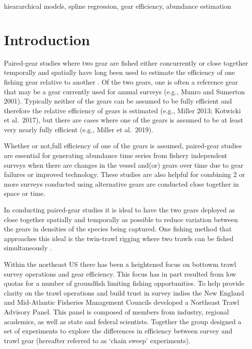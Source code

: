 \documentclass[]{article}
\begin{document}
hieararchical models, spline regression, gear efficiency, abundance
estimation

\pagebreak

\hypertarget{introduction}{%
\section{Introduction}\label{introduction}}

Paired-gear studies where two gear are fished either concurrently or
close together temporally and spatially have long been used to estimate
the efficiency of one fishing gear relative to another
\citep[e.g.,][]{gulland64,bourne65}. Of the two gears, one is often a
reference gear that may be a gear currently used for annual surveys
(e.g., Munro and Sumerton 2001). Typically neither of the gears can be
assumed to be fully efficient and therefore the relative efficiency of
gears is estimated (e.g., Miller 2013; Kotwicki et al.~2017), but there
are cases where one of the gears is assumed to be at least very nearly
fully efficient (e.g., Miller et al.~2019).

Whether or not,full efficiency of one of the gears is assumed,
paired-gear studies are essential for generating abundance time series
from fishery independent surveys when there are changes in the vessel
and(or) gears over time due to gear failures or improved technology.
These studies are also helpful for combining 2 or more surveys conducted
using alternative gears are conducted close together in space or time.

In conducting paired-gear studies it is ideal to have the two gears
deployed as close together spatially and temporally as possible to
reduce variation between the gears in densities of the species being
captured. One fishing method that approaches this ideal is the
twin-trawl rigging where two trawls can be fished simultaneously
\citep{ices96}.

Within the northeast US there has been a heightened focus on bottowm
trawl survey operations and gear efficiency. This focus has in part
resulted from low quotas for a number of groundfish limiting fishing
opportunities. To help provide clarity on the trawl operations and build
trust in survey indies the New England and Mid-Atlantic Fisheries
Management Councils developed a Northeast Trawl Advisory Panel. This
panel is composed of members from industry, regional academics, as well
as state and federal scientists. Together the group designed a set of
experiments to explore the differences in efficiency between survey and
trawl gear (hereafter referred to as `chain sweep' experiments).
\end{document}
